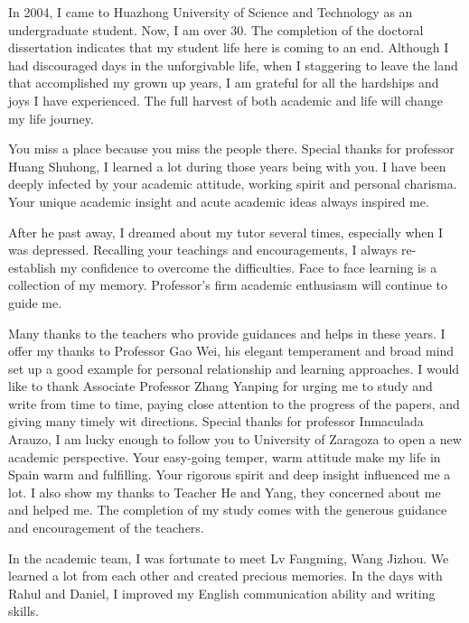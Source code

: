 \begin{ack}
In 2004, I came to Huazhong University of Science and Technology as an undergraduate student. Now, I am over 30. The completion of the doctoral dissertation indicates that my student life here is coming to an end. Although I had discouraged days in the unforgivable life, when I staggering to leave the land that accomplished my grown up years, I am grateful for all the hardships and joys I have experienced.
The full harvest of both academic and life will change my life journey.

You miss a place because you miss the people there. Special thanks for professor Huang Shuhong, I learned a lot during those years being with you. I have been deeply infected by your academic attitude, working spirit and personal charisma. Your unique academic insight and acute academic ideas always inspired me. 

After he past away, I dreamed about my tutor several times, especially when I was depressed. Recalling your teachings and encouragements, I always re-establish my confidence to overcome the difficulties. Face to face learning is a collection of my memory. Professor’s firm academic enthusiasm will continue to guide me.

Many thanks to the teachers who provide guidances and helps in these years. I offer my thanks to Professor Gao Wei, his elegant temperament and broad mind set up a good example for personal relationship and learning approaches.
I would like to thank Associate Professor Zhang Yanping for urging me to study and write from time to time, paying close attention to the progress of the papers, and giving many timely wit directions. 
Special thanks for professor Inmaculada Arauzo, I am lucky enough to follow you to University of Zaragoza to open a new academic perspective. Your easy-going temper, warm attitude make my life in Spain warm and fulfilling. Your rigorous spirit and deep insight influenced me a lot. I also show my thanks to Teacher He and Yang, they concerned about me and helped me. The completion of my study comes with the generous guidance and encouragement of the teachers.

In the academic team, I was fortunate to meet Lv Fangming, Wang Jizhou. We learned a lot from each other and created precious memories. In the days with Rahul and Daniel, I improved my English communication ability and writing skills.


\end{ack}
